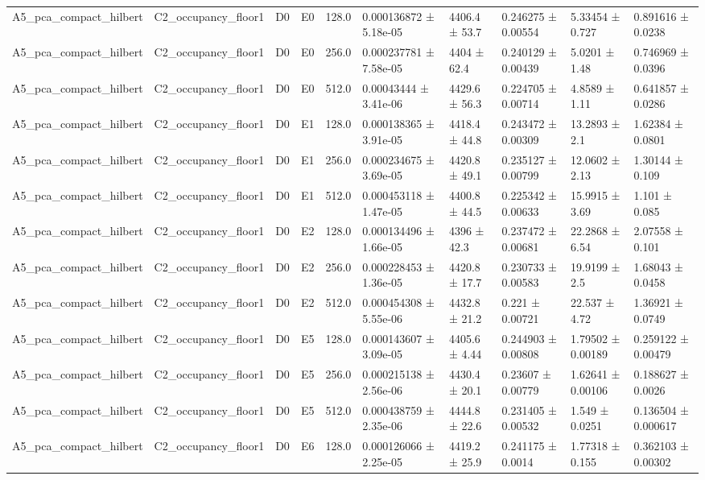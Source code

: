 \begin{table}
\begin{tabular}{llllllllll}
A5\_pca\_compact\_hilbert & C2\_occupancy\_floor1 & D0 & E0 & 128.0 & 0.000136872 ± 5.18e-05 & 4406.4 ± 53.7 & 0.246275 ± 0.00554 & 5.33454 ± 0.727 & 0.891616 ± 0.0238 \\
A5\_pca\_compact\_hilbert & C2\_occupancy\_floor1 & D0 & E0 & 256.0 & 0.000237781 ± 7.58e-05 & 4404 ± 62.4 & 0.240129 ± 0.00439 & 5.0201 ± 1.48 & 0.746969 ± 0.0396 \\
A5\_pca\_compact\_hilbert & C2\_occupancy\_floor1 & D0 & E0 & 512.0 & 0.00043444 ± 3.41e-06 & 4429.6 ± 56.3 & 0.224705 ± 0.00714 & 4.8589 ± 1.11 & 0.641857 ± 0.0286 \\
A5\_pca\_compact\_hilbert & C2\_occupancy\_floor1 & D0 & E1 & 128.0 & 0.000138365 ± 3.91e-05 & 4418.4 ± 44.8 & 0.243472 ± 0.00309 & 13.2893 ± 2.1 & 1.62384 ± 0.0801 \\
A5\_pca\_compact\_hilbert & C2\_occupancy\_floor1 & D0 & E1 & 256.0 & 0.000234675 ± 3.69e-05 & 4420.8 ± 49.1 & 0.235127 ± 0.00799 & 12.0602 ± 2.13 & 1.30144 ± 0.109 \\
A5\_pca\_compact\_hilbert & C2\_occupancy\_floor1 & D0 & E1 & 512.0 & 0.000453118 ± 1.47e-05 & 4400.8 ± 44.5 & 0.225342 ± 0.00633 & 15.9915 ± 3.69 & 1.101 ± 0.085 \\
A5\_pca\_compact\_hilbert & C2\_occupancy\_floor1 & D0 & E2 & 128.0 & 0.000134496 ± 1.66e-05 & 4396 ± 42.3 & 0.237472 ± 0.00681 & 22.2868 ± 6.54 & 2.07558 ± 0.101 \\
A5\_pca\_compact\_hilbert & C2\_occupancy\_floor1 & D0 & E2 & 256.0 & 0.000228453 ± 1.36e-05 & 4420.8 ± 17.7 & 0.230733 ± 0.00583 & 19.9199 ± 2.5 & 1.68043 ± 0.0458 \\
A5\_pca\_compact\_hilbert & C2\_occupancy\_floor1 & D0 & E2 & 512.0 & 0.000454308 ± 5.55e-06 & 4432.8 ± 21.2 & 0.221 ± 0.00721 & 22.537 ± 4.72 & 1.36921 ± 0.0749 \\
A5\_pca\_compact\_hilbert & C2\_occupancy\_floor1 & D0 & E5 & 128.0 & 0.000143607 ± 3.09e-05 & 4405.6 ± 4.44 & 0.244903 ± 0.00808 & 1.79502 ± 0.00189 & 0.259122 ± 0.00479 \\
A5\_pca\_compact\_hilbert & C2\_occupancy\_floor1 & D0 & E5 & 256.0 & 0.000215138 ± 2.56e-06 & 4430.4 ± 20.1 & 0.23607 ± 0.00779 & 1.62641 ± 0.00106 & 0.188627 ± 0.0026 \\
A5\_pca\_compact\_hilbert & C2\_occupancy\_floor1 & D0 & E5 & 512.0 & 0.000438759 ± 2.35e-06 & 4444.8 ± 22.6 & 0.231405 ± 0.00532 & 1.549 ± 0.0251 & 0.136504 ± 0.000617 \\
A5\_pca\_compact\_hilbert & C2\_occupancy\_floor1 & D0 & E6 & 128.0 & 0.000126066 ± 2.25e-05 & 4419.2 ± 25.9 & 0.241175 ± 0.0014 & 1.77318 ± 0.155 & 0.362103 ± 0.00302 \\

\end{tabular}
\end{table}
